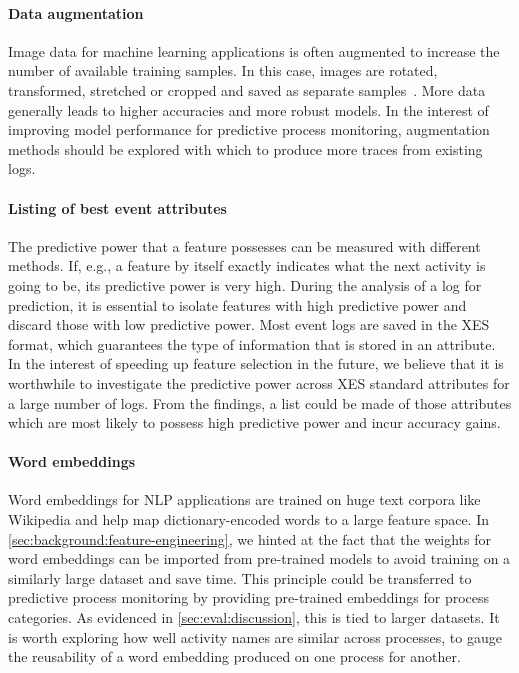 \paragraph{Data augmentation} Image data for machine learning applications is often augmented to increase the number of available training samples.
In this case, images are rotated, transformed, stretched or cropped and saved as separate samples~\cite{Thoma:2017,}.
More data generally leads to higher accuracies and more robust models.
In the interest of improving model performance for predictive process monitoring, augmentation methods should be explored with which to produce more traces from existing logs.

\paragraph{Listing of best event attributes} The predictive power that a feature possesses can be measured with different methods.
If, e.g., a feature by itself exactly indicates what the next activity is going to be, its predictive power is very high.
During the analysis of a log for prediction, it is essential to isolate features with high predictive power and discard those with low predictive power.
Most event logs are saved in the XES format, which guarantees the type of information that is stored in an attribute.
In the interest of speeding up feature selection in the future, we believe that it is worthwhile to investigate the predictive power across XES standard attributes for a large number of logs.
From the findings, a list could be made of those attributes which are most likely to possess high predictive power and incur accuracy gains.

\paragraph{Word embeddings} Word embeddings for NLP applications are trained on huge text corpora like Wikipedia and help map dictionary-encoded words to a large feature space.
In \autoref{sec:background:feature-engineering}, we hinted at the fact that the weights for word embeddings can be imported from pre-trained models to avoid training on a similarly large dataset and save time.
This principle could be transferred to predictive process monitoring by providing pre-trained embeddings for process categories.
As evidenced in \autoref{sec:eval:discussion}, this is tied to larger datasets.
It is worth exploring how well activity names are similar across processes, to gauge the reusability of a word embedding produced on one process for another.

